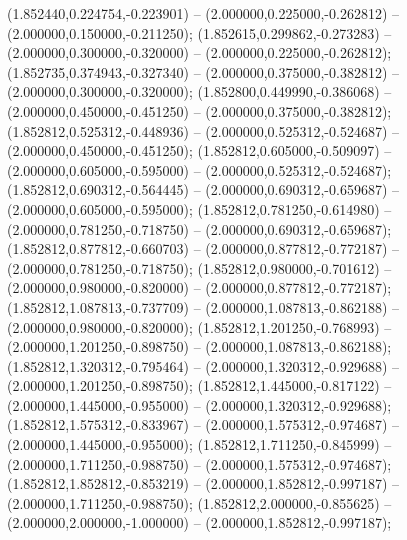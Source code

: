  (1.852440,0.224754,-0.223901) -- (2.000000,0.225000,-0.262812) -- (2.000000,0.150000,-0.211250);
 (1.852615,0.299862,-0.273283) -- (2.000000,0.300000,-0.320000) -- (2.000000,0.225000,-0.262812);
 (1.852735,0.374943,-0.327340) -- (2.000000,0.375000,-0.382812) -- (2.000000,0.300000,-0.320000);
 (1.852800,0.449990,-0.386068) -- (2.000000,0.450000,-0.451250) -- (2.000000,0.375000,-0.382812);
 (1.852812,0.525312,-0.448936) -- (2.000000,0.525312,-0.524687) -- (2.000000,0.450000,-0.451250);
 (1.852812,0.605000,-0.509097) -- (2.000000,0.605000,-0.595000) -- (2.000000,0.525312,-0.524687);
 (1.852812,0.690312,-0.564445) -- (2.000000,0.690312,-0.659687) -- (2.000000,0.605000,-0.595000);
 (1.852812,0.781250,-0.614980) -- (2.000000,0.781250,-0.718750) -- (2.000000,0.690312,-0.659687);
 (1.852812,0.877812,-0.660703) -- (2.000000,0.877812,-0.772187) -- (2.000000,0.781250,-0.718750);
 (1.852812,0.980000,-0.701612) -- (2.000000,0.980000,-0.820000) -- (2.000000,0.877812,-0.772187);
 (1.852812,1.087813,-0.737709) -- (2.000000,1.087813,-0.862188) -- (2.000000,0.980000,-0.820000);
 (1.852812,1.201250,-0.768993) -- (2.000000,1.201250,-0.898750) -- (2.000000,1.087813,-0.862188);
 (1.852812,1.320312,-0.795464) -- (2.000000,1.320312,-0.929688) -- (2.000000,1.201250,-0.898750);
 (1.852812,1.445000,-0.817122) -- (2.000000,1.445000,-0.955000) -- (2.000000,1.320312,-0.929688);
 (1.852812,1.575312,-0.833967) -- (2.000000,1.575312,-0.974687) -- (2.000000,1.445000,-0.955000);
 (1.852812,1.711250,-0.845999) -- (2.000000,1.711250,-0.988750) -- (2.000000,1.575312,-0.974687);
 (1.852812,1.852812,-0.853219) -- (2.000000,1.852812,-0.997187) -- (2.000000,1.711250,-0.988750);
 (1.852812,2.000000,-0.855625) -- (2.000000,2.000000,-1.000000) -- (2.000000,1.852812,-0.997187);
